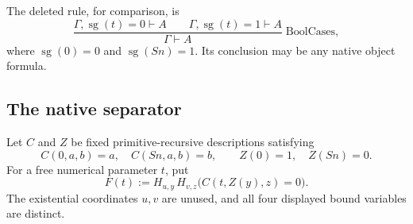 \documentclass[11pt,letterpaper]{article}
\theoremstyle{definition}\newtheorem{definition}[theorem]{Definition}
\theoremstyle{remark}\newtheorem{remark}[theorem]{Remark}
\begin{document}
The deleted rule, for comparison, is
\[
 \frac{\Gamma,\operatorname{sg}(t)=0\vdash A\qquad
       \Gamma,\operatorname{sg}(t)=1\vdash A}
      {\Gamma\vdash A}\;\mathrm{BoolCases},
\]
where $\operatorname{sg}(0)=0$ and $\operatorname{sg}(Sn)=1$.
Its conclusion may be any native object formula.

\subsection{The native separator}

Let $C$ and $Z$ be fixed primitive-recursive descriptions satisfying
\[
 C(0,a,b)=a,\quad C(Sn,a,b)=b,\qquad
 Z(0)=1,\quad Z(Sn)=0.
\]
For a free numerical parameter $t$, put
\[
 \boxed{\quad F(t):=H_{u,y}\,H_{v,z}\bigl(C(t,Z(y),z)=0\bigr).\quad}
 \tag{*}
\]
The existential coordinates $u,v$ are unused, and all four displayed
bound variables are distinct.
\end{document}
